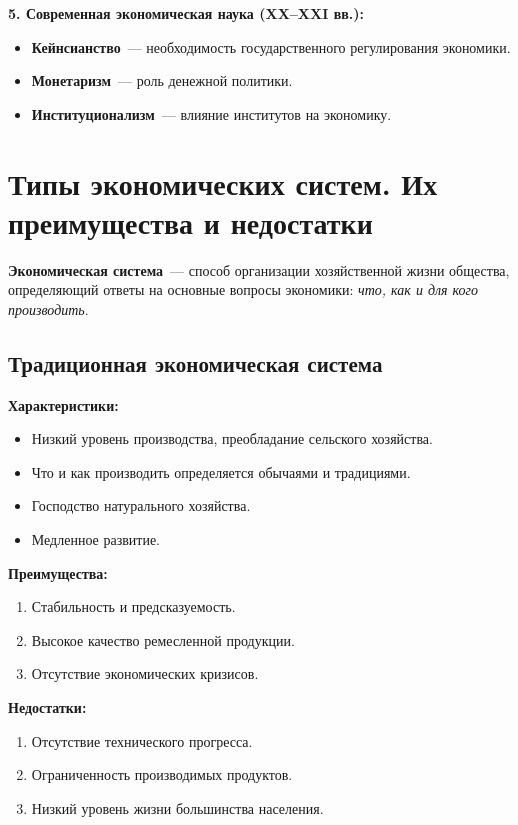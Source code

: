 \documentclass[12pt]{article}
\begin{document}
	\noindent \textbf{5. Современная экономическая наука (XX--XXI вв.):}
	\begin{itemize}
		\item \textbf{Кейнсианство}~--- необходимость государственного регулирования экономики.
		\item \textbf{Монетаризм}~--- роль денежной политики.
		\item \textbf{Институционализм}~--- влияние институтов на экономику.
	\end{itemize}
	
	\section{Типы экономических систем. Их преимущества и недостатки}
	
	\textbf{Экономическая система}~--- способ организации хозяйственной жизни общества, определяющий ответы на основные вопросы экономики: \textit{что, как и для кого производить}.
	
	\subsection{Традиционная экономическая система}
	
	\textbf{Характеристики:}
	\begin{itemize}
		\item Низкий уровень производства, преобладание сельского хозяйства.
		\item Что и как производить определяется обычаями и традициями.
		\item Господство натурального хозяйства.
		\item Медленное развитие.
	\end{itemize}
	
	\noindent \textbf{Преимущества:}
	\begin{enumerate}
		\item Стабильность и предсказуемость.
		\item Высокое качество ремесленной продукции.
		\item Отсутствие экономических кризисов.
	\end{enumerate}
	
	\noindent \textbf{Недостатки:}
	\begin{enumerate}
		\item Отсутствие технического прогресса.
		\item Ограниченность производимых продуктов.
		\item Низкий уровень жизни большинства населения.
	\end{enumerate}
	
\end{document}
